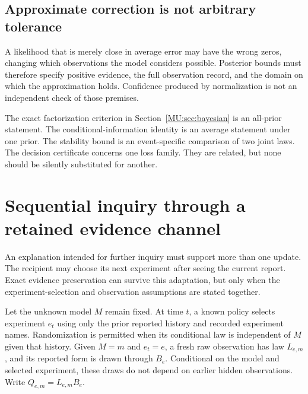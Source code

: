 \subsection{Approximate correction is not arbitrary tolerance}
A likelihood that is merely close in average error may have the wrong zeros, changing which observations the model considers possible. Posterior bounds must therefore specify positive evidence, the full observation record, and the domain on which the approximation holds. Confidence produced by normalization is not an independent check of those premises.

The exact factorization criterion in Section~\ref{MU:sec:bayesian} is an all-prior statement. The conditional-information identity is an average statement under one prior. The stability bound is an event-specific comparison of two joint laws. The decision certificate concerns one loss family. They are related, but none should be silently substituted for another.


\section{Sequential inquiry through a retained evidence channel}\label{MU:sec:sequential}
An explanation intended for further inquiry must support more than one update. The recipient may choose its next experiment after seeing the current report. Exact evidence preservation can survive this adaptation, but only when the experiment-selection and observation assumptions are stated together.

Let the unknown model $M$ remain fixed. At time $t$, a known policy selects experiment $e_t$ using only the prior reported history and recorded experiment names. Randomization is permitted when its conditional law is independent of $M$ given that history. Given $M=m$ and $e_t=e$, a fresh raw observation has law $L_{e,m}$, and its reported form is drawn through $B_e$. Conditional on the model and selected experiment, these draws do not depend on earlier hidden observations. Write $Q_{e,m}=L_{e,m}B_e$.

